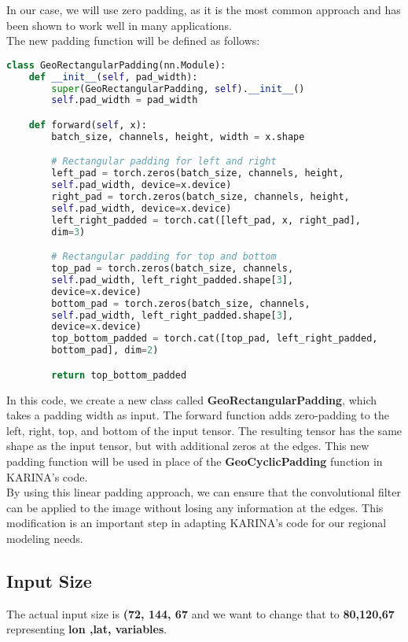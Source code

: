 In our case, we will use zero padding, as it is the most common approach and has been shown to work well in many applications.\\

The new padding function will be defined as follows:\\


\begin{lstlisting}[language=Python, frame=single, basicstyle=\ttfamily\small, backgroundcolor=\color{red!10}]
class GeoRectangularPadding(nn.Module):
    def __init__(self, pad_width):
        super(GeoRectangularPadding, self).__init__()
        self.pad_width = pad_width

    def forward(self, x):
        batch_size, channels, height, width = x.shape

        # Rectangular padding for left and right
        left_pad = torch.zeros(batch_size, channels, height,
        self.pad_width, device=x.device)
        right_pad = torch.zeros(batch_size, channels, height,
        self.pad_width, device=x.device)
        left_right_padded = torch.cat([left_pad, x, right_pad],
        dim=3)

        # Rectangular padding for top and bottom
        top_pad = torch.zeros(batch_size, channels,
        self.pad_width, left_right_padded.shape[3], 
        device=x.device)
        bottom_pad = torch.zeros(batch_size, channels,
        self.pad_width, left_right_padded.shape[3], 
        device=x.device)
        top_bottom_padded = torch.cat([top_pad, left_right_padded,
        bottom_pad], dim=2)

        return top_bottom_padded
\end{lstlisting}


In this code, we create a new class called \textbf{GeoRectangularPadding}, which takes a padding width as input. The forward function adds zero-padding to the left, right, top, and bottom of the input tensor. The resulting tensor has the same shape as the input tensor, but with additional zeros at the edges. This new padding function will be used in place of the \textbf{GeoCyclicPadding} function in KARINA's code.\\

By using this linear padding approach, we can ensure that the convolutional filter can be applied to the image without losing any information at the edges. This modification is an important step in adapting KARINA's code for our regional modeling needs.\\

\subsection*{Input Size}

The actual input size is \textbf{(72, 144, 67} and we want to change that to \textbf{80,120,67} representing \textbf{lon ,lat, variables}.